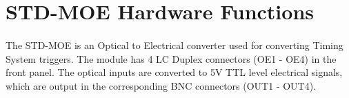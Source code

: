 \documentclass[openany]{article}
\begin{document}
\section{STD-MOE Hardware Functions}

	\paragraph{} The STD-MOE is an Optical to Electrical converter used for converting Timing System triggers. The module has 4 LC Duplex connectors (OE1 - OE4) in the front panel. The optical inputs are converted to 5V TTL level electrical signals, which are output in the corresponding BNC connectors (OUT1 - OUT4).
\end{document}
